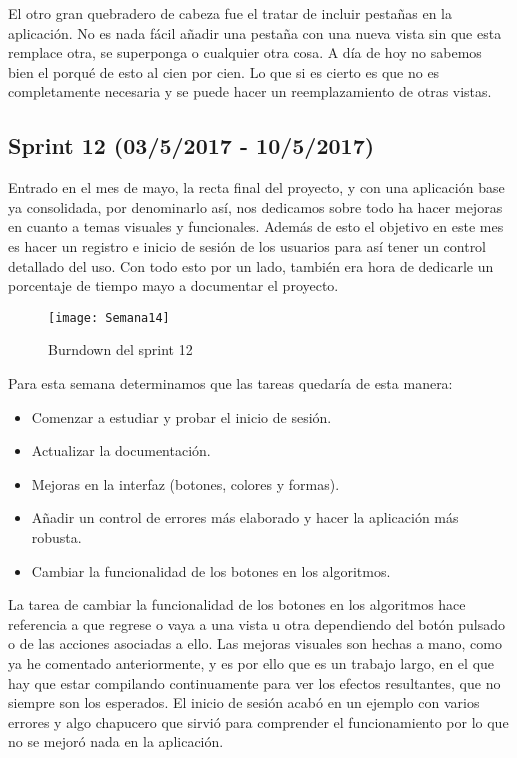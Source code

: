 El otro gran quebradero de cabeza fue el tratar de incluir pestañas en la aplicación. No es nada fácil añadir una pestaña con una nueva vista sin que esta remplace otra, se superponga o cualquier otra cosa. A día de hoy no sabemos bien el porqué de esto al cien por cien. Lo que si es cierto es que no es completamente necesaria y se puede hacer un reemplazamiento de otras vistas.

\subsection{Sprint 12 (03/5/2017 - 10/5/2017)}

Entrado en el mes de mayo, la recta final del proyecto, y con una aplicación base ya consolidada, por denominarlo así, nos dedicamos sobre todo ha hacer mejoras en cuanto a temas visuales y funcionales. Además de esto el objetivo en este mes es hacer un registro e inicio de sesión de los usuarios para así tener un control detallado del uso.
Con todo esto por un lado, también era hora de dedicarle un porcentaje de tiempo mayo a documentar el proyecto. 

\begin{figure}[h]
\centering
\texttt{[image: Semana14]}
\caption{Burndown del sprint 12}
\label{fig:A.2.6}
\end{figure}

Para esta semana determinamos que las tareas quedaría de esta manera:

\begin{itemize}
\item Comenzar a estudiar y probar el inicio de sesión.
\item Actualizar la documentación.
\item Mejoras en la interfaz (botones, colores y formas).
\item Añadir un control de errores más elaborado y hacer la aplicación más robusta.
\item Cambiar la funcionalidad de los botones en los algoritmos.
\end{itemize}

La tarea de cambiar la funcionalidad de los botones en los algoritmos hace referencia a que regrese o vaya a una vista u otra dependiendo del botón pulsado o de las acciones asociadas a ello.
Las mejoras visuales son hechas a mano, como ya he comentado anteriormente, y es por ello que es un trabajo largo, en el que hay que estar compilando continuamente para ver los efectos resultantes, que no siempre son los esperados.
El inicio de sesión acabó en un ejemplo con varios errores y algo chapucero que sirvió para comprender el funcionamiento por lo que no se mejoró nada en la aplicación.

